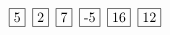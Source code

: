 \documentclass{article}
\newcommand{\sep}{\hspace*{.5em}}
\begin{document}
\noindent $\fbox{5} \sep \fbox{2} \sep \fbox{7} \sep \fbox{-5} \sep \fbox{16} \sep \fbox{12}$
\end{document}
